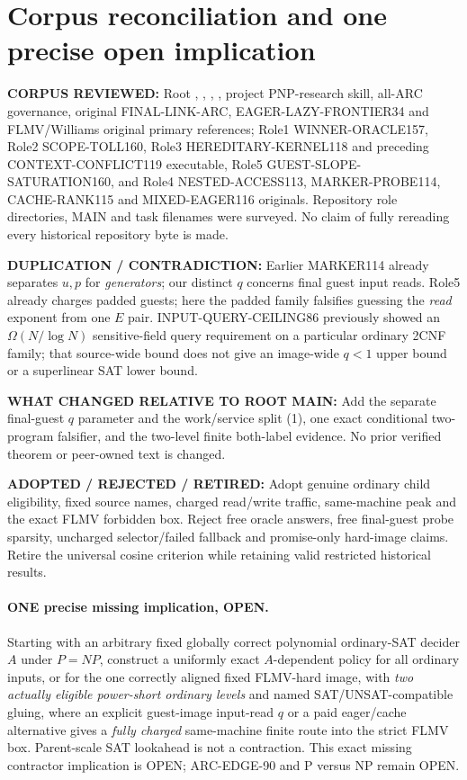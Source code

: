 \documentclass[11pt]{article}
\begin{document}
\section{Corpus reconciliation and one precise open implication}
\textbf{CORPUS REVIEWED:} Root ,
, ,
, project PNP-research skill,
all-ARC governance, original FINAL-LINK-ARC,
EAGER-LAZY-FRONTIER34 and FLMV/Williams original
primary references; Role1 WINNER-ORACLE157,
Role2 SCOPE-TOLL160, Role3 HEREDITARY-KERNEL118
and preceding CONTEXT-CONFLICT119 executable,
Role5 GUEST-SLOPE-SATURATION160, and Role4
NESTED-ACCESS113, MARKER-PROBE114,
CACHE-RANK115 and MIXED-EAGER116 originals.
Repository role directories, MAIN and task filenames
were surveyed. No claim of fully rereading every
historical repository byte is made.

\textbf{DUPLICATION / CONTRADICTION:} Earlier MARKER114
already separates $u,p$ for \emph{generators};
our distinct $q$ concerns final guest input reads.
Role5 already charges padded guests; here the
padded family falsifies guessing the \emph{read}
exponent from one $E$ pair.
INPUT-QUERY-CEILING86 previously showed an
$\Omega(N/\log N)$ sensitive-field query
requirement on a particular ordinary 2CNF family;
that source-wide bound does not give an image-wide
$q<1$ upper bound or a superlinear SAT lower bound.

\textbf{WHAT CHANGED RELATIVE TO ROOT MAIN:}
Add the separate final-guest $q$ parameter and
the work/service split (1), one exact conditional
two-program falsifier, and the two-level finite
both-label evidence. No prior verified theorem
or peer-owned text is changed.

\textbf{ADOPTED / REJECTED / RETIRED:}
Adopt genuine ordinary child eligibility, fixed
source names, charged read/write traffic, same-machine
peak and the exact FLMV forbidden box. Reject
free oracle answers, free final-guest probe
sparsity, uncharged selector/failed fallback
and promise-only hard-image claims. Retire the
universal cosine criterion while retaining valid
restricted historical results.

\paragraph{ONE precise missing implication, OPEN.}
Starting with an arbitrary fixed globally correct
polynomial ordinary-SAT decider $A$ under $P=NP$,
construct a uniformly exact $A$-dependent policy
for all ordinary inputs, or for the one correctly
aligned fixed FLMV-hard image, with \emph{two actually
eligible power-short ordinary levels} and named
SAT/UNSAT-compatible gluing, where an explicit
guest-image input-read $q$ or a paid eager/cache
alternative gives a \emph{fully charged}
same-machine finite route into the strict FLMV
box. Parent-scale SAT lookahead is not a
contraction. This exact missing contractor
implication is OPEN; ARC-EDGE-90 and P versus NP
remain OPEN.
\end{document}

